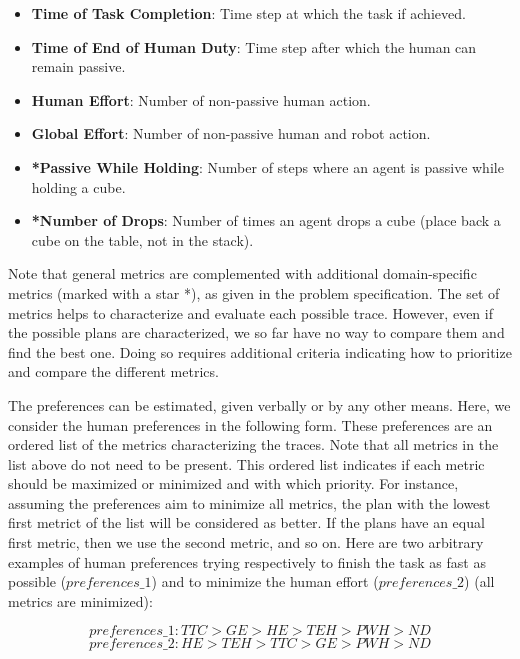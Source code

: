 \begin{itemize}
    \item \textbf{Time of Task Completion}: Time step at which the task if achieved.
    \item \textbf{Time of End of Human Duty}: Time step after which the human can remain passive.
    \item \textbf{Human Effort}: Number of non-passive human action.
    \item \textbf{Global Effort}: Number of non-passive human and robot action.
    \item \textbf{*Passive While Holding}: Number of steps where an agent is passive while holding a cube.
    \item \textbf{*Number of Drops}: Number of times an agent drops a cube (place back a cube on the table, not in the stack).
\end{itemize}

Note that general metrics are complemented with additional domain-specific metrics (marked with a star *), as given in the problem specification. The set of metrics helps to characterize and evaluate each possible trace. However, even if the possible plans are characterized, we so far have no way to compare them and find the best one. Doing so requires additional criteria indicating how to prioritize and compare the different metrics.

The preferences can be estimated, given verbally or by any other means. Here, we consider the human preferences in the following form. These preferences are an ordered list of the metrics characterizing the traces. Note that all metrics in the list above do not need to be present. This ordered list indicates if each metric should be maximized or minimized and with which priority. For instance, assuming the preferences aim to minimize all metrics, the plan with the lowest first metrict of the list will be considered as better. If the plans have an equal first metric, then we use the second metric, and so on. Here are two arbitrary examples of human preferences trying respectively to finish the task as fast as possible ($preferences\_1$) and to minimize the human effort ($preferences\_2$) (all metrics are minimized):

\begin{equation*}
    preferences\_1: TTC > GE > HE > TEH > PWH > ND 
\end{equation*}
\begin{equation*}
    preferences\_2: HE > TEH > TTC > GE > PWH > ND 
\end{equation*}


